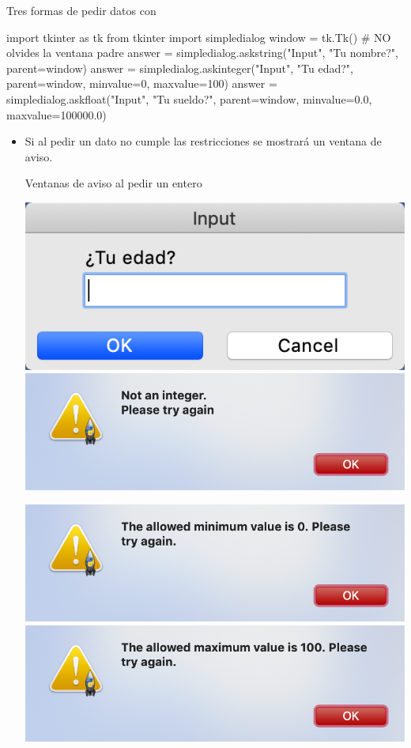 \documentclass[10pt, envcountsect , spanish]{beamer}
\begin{document}
\begin{frame}[fragile]{Tres formas de pedir datos con } 

\footnotesize
\begin{pyverbatim}[][frame=single]
import tkinter as tk
from tkinter import simpledialog
window = tk.Tk()  # NO olvides la ventana padre
answer = simpledialog.askstring("Input", "Tu nombre?", parent=window)
answer = simpledialog.askinteger("Input", "Tu edad?",  parent=window,
                                 minvalue=0, maxvalue=100)
answer = simpledialog.askfloat("Input", "Tu sueldo?",  parent=window,
                               minvalue=0.0, maxvalue=100000.0)
\end{pyverbatim}

\begin{itemize}
\item
Si al pedir un dato no cumple las restricciones se mostrará un ventana de aviso.

\unEjemplo Ventanas de aviso al pedir un entero

\hfil\begin{minipage}{.8\textwidth}
\centerline{\includegraphics[width=.4\textwidth]{fig/askinteger} \hfill
\includegraphics[width=.45\textwidth]{fig/askintegerError}
}

\centerline{\includegraphics[width=.45\textwidth]{fig/askintegerMin} \hfill
\includegraphics[width=.45\textwidth]{fig/askintegerMax}
}
\end{minipage}
\end{itemize}


\end{frame}
\end{document}
